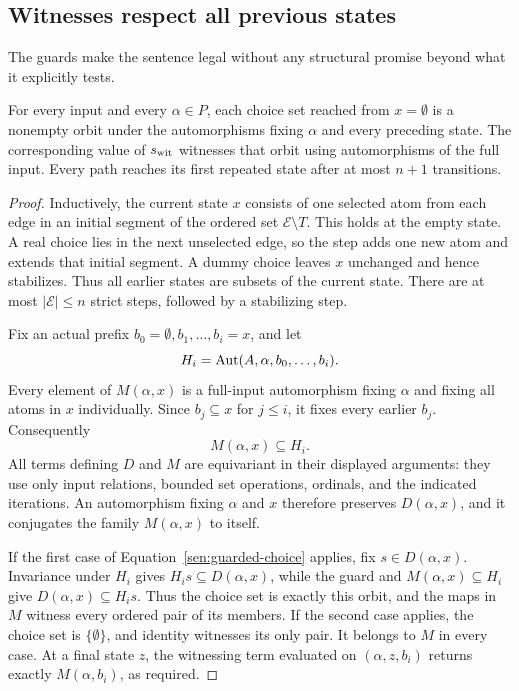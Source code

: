 \subsection{Witnesses respect all previous states}

The guards make the sentence legal without any structural promise beyond
what it explicitly tests.

\begin{lemma}\label{sen:history}
For every input and every \(\alpha\in P\), each choice set reached from
\(x=\emptyset\) is a nonempty orbit under the automorphisms fixing
\(\alpha\) and every preceding state. The corresponding value of
\(s_{\rm wit}\) witnesses that orbit using automorphisms of the full
input. Every path reaches its first repeated state after at most
\(n+1\) transitions.
\end{lemma}
\begin{proof}
Inductively, the current state \(x\) consists of one selected atom from
each edge in an initial segment of the ordered set
\(\mathcal E\setminus T\). This holds at the empty state.
A real choice lies in the next unselected edge, so the step adds one new
atom and extends that initial segment. A dummy choice leaves \(x\)
unchanged and hence stabilizes. Thus all earlier states are subsets of
the current state. There are at most \(|\mathcal E|\leq n\) strict
steps, followed by a stabilizing step.

Fix an actual prefix \(b_0=\emptyset,b_1,\ldots,b_i=x\), and let
\[
 H_i=\operatorname{Aut}(A,\alpha,b_0,\ldots,b_i).
\]
Every element of \(M(\alpha,x)\) is a full-input automorphism fixing
\(\alpha\) and fixing all atoms in \(x\) individually. Since
\(b_j\subseteq x\) for \(j\leq i\), it fixes every earlier \(b_j\).
Consequently
\[
                         M(\alpha,x)\subseteq H_i.
\]
All terms defining \(D\) and \(M\) are equivariant in their displayed
arguments: they use only input relations, bounded set operations,
ordinals, and the indicated iterations. An automorphism fixing
\(\alpha\) and \(x\) therefore preserves \(D(\alpha,x)\), and it
conjugates the family \(M(\alpha,x)\) to itself.

If the first case of Equation~\eqref{sen:guarded-choice} applies, fix
\(s\in D(\alpha,x)\). Invariance under \(H_i\) gives
\(H_i s\subseteq D(\alpha,x)\), while the guard and
\(M(\alpha,x)\subseteq H_i\) give
\(D(\alpha,x)\subseteq H_i s\). Thus the choice set is exactly this
orbit, and the maps in \(M\) witness every ordered pair of its members.
If the second case applies, the choice set is \(\{\emptyset\}\),
and identity witnesses its only pair. It belongs to \(M\) in every
case. At a final state \(z\), the witnessing term evaluated on
\((\alpha,z,b_i)\) returns exactly \(M(\alpha,b_i)\), as required.
\end{proof}


